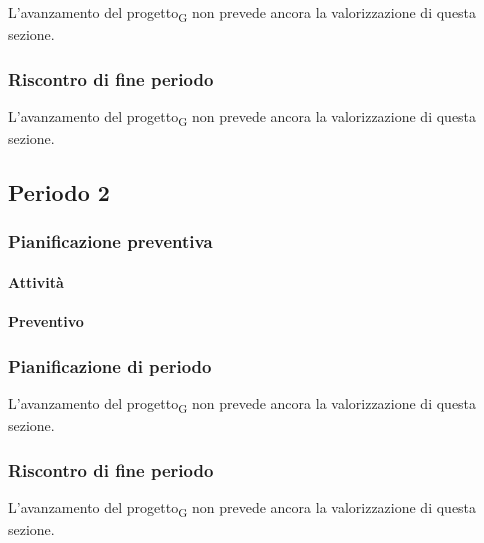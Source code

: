 L'avanzamento del progetto\textsubscript{G} non prevede ancora la valorizzazione di questa sezione.



\subsubsection{Riscontro di fine periodo}


L'avanzamento del progetto\textsubscript{G} non prevede ancora la valorizzazione di questa sezione.





\subsection{Periodo 2}

\subsubsection{Pianificazione preventiva}

\paragraph{Attività}

\planningTable{
	
}

\paragraph{Preventivo}

\smallPreventivoTable{
	
}


\subsubsection{Pianificazione di periodo}

L'avanzamento del progetto\textsubscript{G} non prevede ancora la valorizzazione di questa sezione.



\subsubsection{Riscontro di fine periodo}

L'avanzamento del progetto\textsubscript{G} non prevede ancora la valorizzazione di questa sezione.






